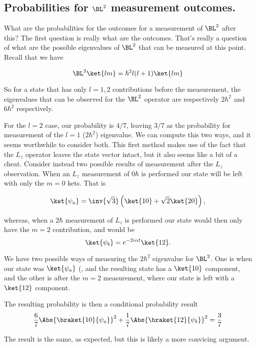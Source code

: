 \subsection{Probabilities for $\BL^2$ measurement outcomes.}

What are the probabilities for the outcomes for a measurement of $\BL^2$ after this?  The first question is really what are the outcomes.  That's really a question of what are the possible eigenvalues of $\BL^2$ that can be measured at this point.  Recall that we have

\begin{equation}\label{eqn:qmIexam2010:60}
\BL^2 \ket{l m} = \hbar^2 l (l + 1) \ket{l m}
\end{equation}

So for a state that has only $l=1,2$ contributions before the measurement, the eigenvalues that can be observed for the $\BL^2$ operator are respectively $2 \hbar^2$ and $6 \hbar^2$ respectively.

For the $l=2$ case, our probability is $4/7$, leaving $3/7$ as the probability for measurement of the $l=1$ ($2 \hbar^2$) eigenvalue.  We can compute this two ways, and it seems worthwhile to consider both.  This first method makes use of the fact that the $L_z$ operator leaves the state vector intact, but it also seems like a bit of a cheat.  Consider instead two possible results of measurement after the $L_z$ observation.  When an $L_z$ measurement of $0 \hbar$ is performed our state will be left with only the $m=0$ kets.  That is

\begin{equation}\label{eqn:qmIexam2010:70}
\ket{\psi_a} = \inv{\sqrt{3}} \left( \ket{10} + \sqrt{2} \ket{20} \right),
\end{equation}

whereas, when a $2 \hbar$ measurement of $L_z$ is performed our state would then only have the $m=2$ contribution, and would be
\begin{equation}\label{eqn:qmIexam2010:80}
\ket{\psi_b} = e^{-2 i \alpha t} \ket{12 }.
\end{equation}

We have two possible ways of measuring the $2 \hbar^2$ eigenvalue for $\BL^2$.  One is when our state was $\ket{\psi_a}$ (, and the resulting state has a $\ket{10}$ component, and the other is after the $m=2$ measurement, where our state is left with a $\ket{12}$ component.

The resulting probability is then a conditional probability result
\begin{equation}\label{eqn:qmIexam2010:n}
\frac{6}{7} \Abs{ \braket{10}{\psi_a} }^2 + \frac{1}{7} \Abs{ \braket{12 }{\psi_b}}^2 = \frac{3}{7}
\end{equation}

The result is the same, as expected, but this is likely a more convicing argument.


\EndNoBibArticle
